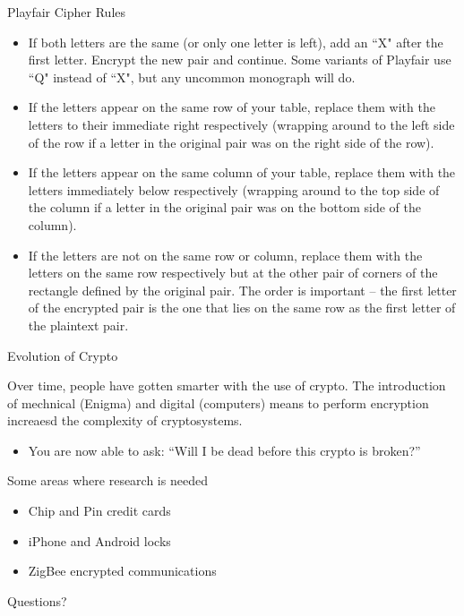 \documentclass{beamer}
\begin{document}
\begin{frame}{Playfair Cipher Rules}
		\begin{itemize}
			\item If both letters are the same (or only one letter is left), add an ``X" after the first letter. Encrypt the new pair and continue. Some variants of Playfair use ``Q" instead of ``X", but any uncommon monograph will do.
			\item If the letters appear on the same row of your table, replace them with the letters to their immediate right respectively (wrapping around to the left side of the row if a letter in the original pair was on the right side of the row).
			\item If the letters appear on the same column of your table, replace them with the letters immediately below respectively (wrapping around to the top side of the column if a letter in the original pair was on the bottom side of the column).
			\item If the letters are not on the same row or column, replace them with the letters on the same row respectively but at the other pair of corners of the rectangle defined by the original pair. The order is important – the first letter of the encrypted pair is the one that lies on the same row as the first letter of the plaintext pair.
		\end{itemize}
\end{frame}

\begin{frame}{Evolution of Crypto}
	\begin{block}{}
		Over time, people have gotten smarter with the use of crypto. The introduction of mechnical (Enigma) and digital (computers) means to perform encryption increaesd the complexity of cryptosystems. 
		\begin{itemize}
			\item You are now able to ask: ``Will I be dead before this crypto is broken?''
		\end{itemize}
	\end{block}
	\begin{block}{Some areas where research is needed}
		\begin{itemize}
			\item Chip and Pin credit cards
			\item iPhone and Android locks
			\item ZigBee encrypted communications
		\end{itemize}
	\end{block}
\end{frame}

\begin{frame}{Questions?}
\end{frame}
\end{document}

